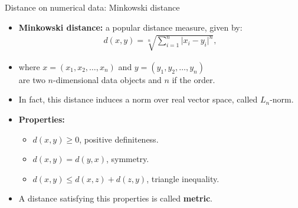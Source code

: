 \documentclass[aspectratio=169,t]{beamer}
\begin{document}
  { 
    \begin{frame}{Distance on numerical data: Minkowski distance}
    \begin{itemize}
      \item \textbf{Minkowski distance:} a popular distance measure, given by:
            \begin{align}
              d(x,y) = \sqrt[n]{\sum_{i=1}^{n} \vert x_i-y_i \vert^n},
            \end{align}
      \item where $x = (x_1,x_2, \ldots, x_n)$ and $y = (y_1,y_2,\ldots,y_n)$ \\ are two $n$-dimensional data objects and $n$ if the order.
      \item In fact, this distance induces a norm over real vector space, called $L_n$-norm.
      \item \textbf{Properties:}
      \begin{itemize}
          \item $d(x,y) \geq 0$, positive definiteness.
          \item $d(x,y) = d(y,x)$, symmetry.
          \item $d(x,y) \leq d(x,z) + d(z,y)$, triangle inequality.
      \end{itemize}
      \item A distance satisfying this properties is called \textbf{metric}.
    \end{itemize}
    \end{frame}
  }
\end{document}
